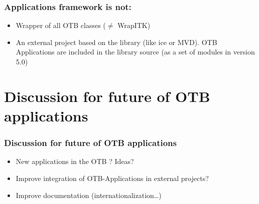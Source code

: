 \documentclass[8pt]{beamer}
\begin{document}
\begin{frame}
\frametitle{Applications framework is not:}
\begin{itemize}
  \item Wrapper of all OTB classes ($\neq$ WrapITK)
  \item An external project based on the library (like ice or MVD). OTB
    Applications are included in the library source (as a set of modules in
    version 5.0)
\end{itemize}
\end{frame}

\section{Discussion for future of OTB applications}
\begin{frame}
\frametitle{Discussion for future of OTB applications}
\begin{itemize}
  \item New applications in the OTB ? Ideas?  
  \item Improve integration of OTB-Applications in external projects?
  \item Improve documentation (internationalization\ldots)
\end{itemize}
\end{frame}
\end{document}
